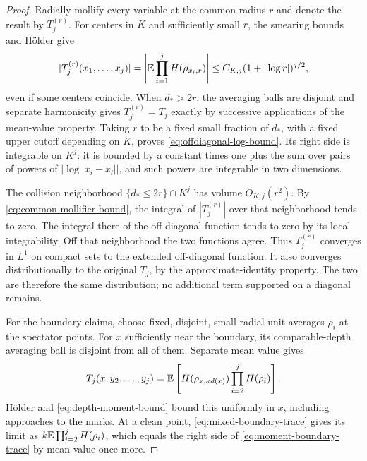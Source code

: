 \begin{proof}
Radially mollify every variable at the common radius $r$ and denote
the result by $T_j^{(r)}$. For centers in $K$ and sufficiently small
$r$, the smearing bounds and H\"older give
\begin{equation}
 |T_j^{(r)}(x_1,\ldots,x_j)|
  =\left|\mathbb E\prod_{i=1}^j H(\rho_{x_i,r})\right|
       \le C_{K,j}(1+|\log r|)^{j/2},
 \label{eq:common-mollifier-bound}
\end{equation}
even if some centers coincide. When $d_*>2r$, the averaging balls
are disjoint and separate harmonicity gives
$T_j^{(r)}=T_j$ exactly by successive applications of the mean-value
property. Taking $r$ to be a fixed small fraction of $d_*$, with a
fixed upper cutoff depending on $K$, proves
\eqref{eq:offdiagonal-log-bound}. Its right side is integrable on
$K^j$: it is bounded by a constant times one plus the sum over
pairs of powers of $|\log|x_i-x_l||$, and such powers are
integrable in two dimensions.

The collision neighborhood $\{d_*\le2r\}\cap K^j$ has volume
$O_{K,j}(r^2)$. By \eqref{eq:common-mollifier-bound}, the integral
of $|T_j^{(r)}|$ over that neighborhood tends to zero. The integral
there of the off-diagonal function tends to zero by its local
integrability. Off that neighborhood the two functions agree.
Thus $T_j^{(r)}$ converges in $L^1$ on compact sets to the extended
off-diagonal function. It also converges distributionally to the
original $T_j$, by the approximate-identity property. The two are
therefore the same distribution; no additional term supported on
a diagonal remains.

For the boundary claims, choose fixed, disjoint, small radial unit
averages $\rho_i$ at the spectator points. For $x$ sufficiently
near the boundary, its comparable-depth averaging ball is disjoint
from all of them. Separate mean value gives
\[
 T_j(x,y_2,\ldots,y_j)
   =\mathbb E\left[H(\rho_{x,\kappa d(x)})
                         \prod_{i=2}^jH(\rho_i)\right].
\]
H\"older and \eqref{eq:depth-moment-bound} bound this uniformly in
$x$, including approaches to the marks. At a clean point,
\eqref{eq:mixed-boundary-trace} gives its limit as
$k\mathbb E\prod_{i=2}^jH(\rho_i)$, which equals the right side of
\eqref{eq:moment-boundary-trace} by mean value once more.
\end{proof}
